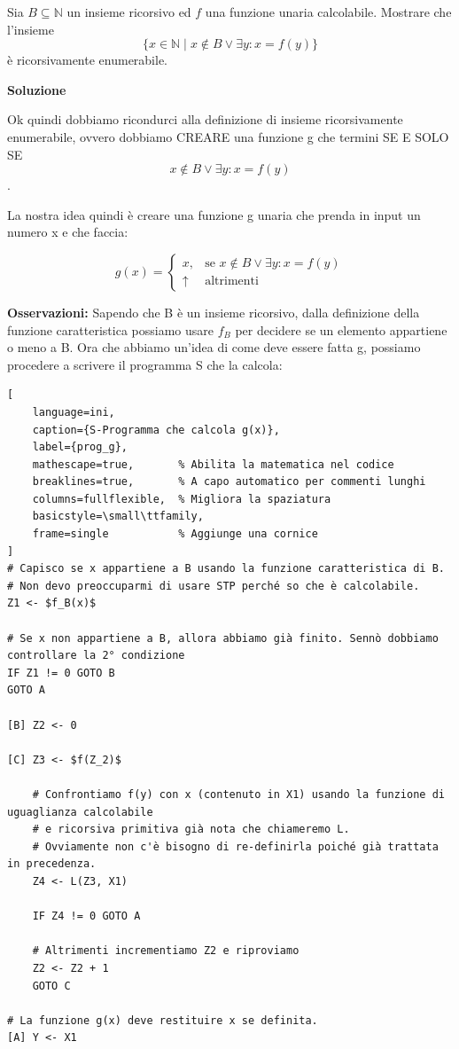 Sia $B \subseteq \mathbb{N}$ un insieme ricorsivo ed $f$ una funzione unaria calcolabile. Mostrare che l'insieme
$$
\{ x \in \mathbb{N} \mid x \notin B \lor \exists y : x = f(y) \}
$$
è ricorsivamente enumerabile.

\textbf{Soluzione}

Ok quindi dobbiamo ricondurci alla definizione di insieme ricorsivamente enumerabile, ovvero dobbiamo CREARE una funzione g che termini SE E SOLO SE $$  x \notin B \lor \exists y : x = f(y) $$.

La nostra idea quindi è creare una funzione g unaria che prenda in input un numero x e che faccia:

\begin{equation}
  g(x) = \begin{cases}
    x, & \text{se } x \notin B \lor \exists y : x = f(y) \\
    \uparrow & \text{altrimenti}
  \end{cases}
\end{equation}

\textbf{Osservazioni:} Sapendo che B è un insieme ricorsivo, dalla definizione della funzione caratteristica possiamo usare $f_B$ per decidere se un elemento appartiene o meno a B.
Ora che abbiamo un'idea di come deve essere fatta g, possiamo procedere a scrivere il programma S che la calcola:

\begin{lstlisting}[
    language=ini, 
    caption={S-Programma che calcola g(x)}, 
    label={prog_g},
    mathescape=true,       % Abilita la matematica nel codice
    breaklines=true,       % A capo automatico per commenti lunghi
    columns=fullflexible,  % Migliora la spaziatura
    basicstyle=\small\ttfamily,
    frame=single           % Aggiunge una cornice
]
# Capisco se x appartiene a B usando la funzione caratteristica di B. 
# Non devo preoccuparmi di usare STP perché so che è calcolabile.
Z1 <- $f_B(x)$

# Se x non appartiene a B, allora abbiamo già finito. Sennò dobbiamo controllare la 2° condizione
IF Z1 != 0 GOTO B
GOTO A

[B] Z2 <- 0

[C] Z3 <- $f(Z_2)$
    
    # Confrontiamo f(y) con x (contenuto in X1) usando la funzione di uguaglianza calcolabile 
    # e ricorsiva primitiva già nota che chiameremo L.
    # Ovviamente non c'è bisogno di re-definirla poiché già trattata in precedenza.
    Z4 <- L(Z3, X1)
    
    IF Z4 != 0 GOTO A
    
    # Altrimenti incrementiamo Z2 e riproviamo
    Z2 <- Z2 + 1
    GOTO C

# La funzione g(x) deve restituire x se definita.
[A] Y <- X1
    
\end{lstlisting}

